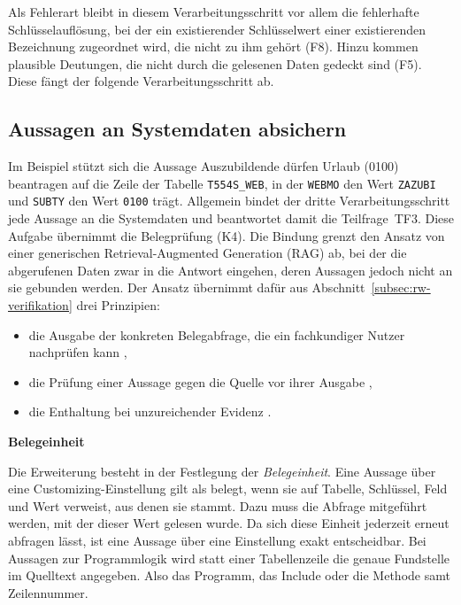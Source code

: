 Als Fehlerart bleibt in diesem Verarbeitungsschritt vor allem die fehlerhafte Schlüsselauflösung, bei der ein existierender Schlüsselwert einer existierenden Bezeichnung zugeordnet wird, die nicht zu ihm gehört (F8). Hinzu kommen plausible Deutungen, die nicht durch die gelesenen Daten gedeckt sind (F5). Diese fängt der folgende Verarbeitungsschritt ab.

\subsection{Aussagen an Systemdaten absichern}
\label{subsec:ta-absichern}

Im Beispiel stützt sich die Aussage \glqq Auszubildende dürfen Urlaub (0100) beantragen\grqq{} auf die Zeile der Tabelle \texttt{T554S\_WEB}, in der \texttt{WEBMO} den Wert \texttt{ZAZUBI} und \texttt{SUBTY} den Wert \texttt{0100} trägt. Allgemein bindet der dritte Verarbeitungsschritt jede Aussage an die Systemdaten und beantwortet damit die Teilfrage~TF3. Diese Aufgabe übernimmt die Belegprüfung (K4). Die Bindung grenzt den Ansatz von einer generischen Retrieval-Augmented Generation (RAG) ab, bei der die abgerufenen Daten zwar in die Antwort eingehen, deren Aussagen jedoch nicht an sie gebunden werden. Der Ansatz übernimmt dafür aus Abschnitt~\ref{subsec:rw-verifikation} drei Prinzipien:
\begin{itemize}
	\item die Ausgabe der konkreten Belegabfrage, die ein fachkundiger Nutzer nachprüfen kann \cite{theologitis_thucy_2026},
	\item die Prüfung einer Aussage gegen die Quelle vor ihrer Ausgabe \cite{allemang_increasing_2025},
	\item die Enthaltung bei unzureichender Evidenz \cite{somov_confidence_2025}.
\end{itemize}

\textbf{Belegeinheit}

Die Erweiterung besteht in der Festlegung der \emph{Belegeinheit}. Eine Aussage über eine Customizing-Einstellung gilt als belegt, wenn sie auf Tabelle, Schlüssel, Feld und Wert verweist, aus denen sie stammt. Dazu muss die Abfrage mitgeführt werden, mit der dieser Wert gelesen wurde. Da sich diese Einheit jederzeit erneut abfragen lässt, ist eine Aussage über eine Einstellung exakt entscheidbar. Bei Aussagen zur Programmlogik wird statt einer Tabellenzeile die genaue Fundstelle im Quelltext angegeben. Also das Programm, das Include oder die Methode samt Zeilennummer.

